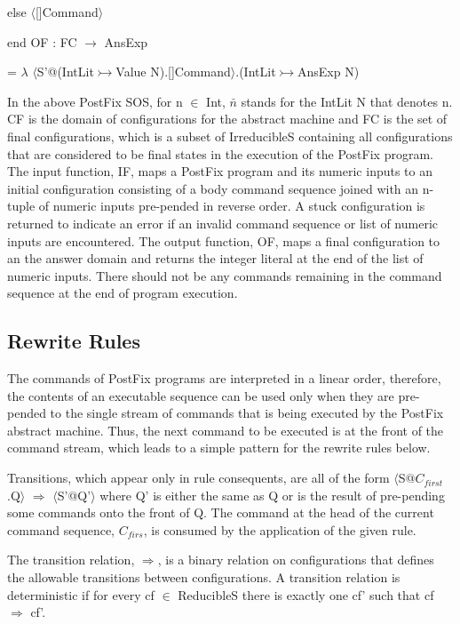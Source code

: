 \documentclass[a4paper,11pt]{article}
\begin{document}
\begin{par} else $\langle$[]Command$\rangle$ \end{par}
\begin{par} end \newline
OF : FC $\rightarrow$ AnsExp \end{par}
\begin{par} = $\lambda$ $\langle$S'@(IntLit$\rightarrowtail$Value N).[]Command$\rangle$.(IntLit$\rightarrowtail$AnsExp N) \end{par} \vspace{5mm}
\begin{par} In the above PostFix SOS, for n $\in$ Int, $\bar{n}$ stands for the IntLit N that denotes n. CF is the domain of configurations for the abstract machine and FC is the set of final configurations, which is a subset of IrreducibleS containing all configurations that are considered to be final states in the execution of the PostFix program. The input function, IF, maps a PostFix program and its numeric inputs to an initial configuration consisting of a body command sequence joined with an n-tuple of numeric inputs pre-pended in reverse order. A stuck configuration is returned to indicate an error if an invalid command sequence or list of numeric inputs are encountered. The output function, OF, maps a final configuration to an the answer domain and returns the integer literal at the end of the list of numeric inputs. There should not be any commands remaining in the command sequence at the end of program execution. \end{par}
\subsection{Rewrite Rules}
\begin{par} The commands of PostFix programs are interpreted in a linear order, therefore, the contents of an executable sequence can be used only when they are pre-pended to the single stream of commands that is being executed by the PostFix abstract machine. Thus, the next command to be executed is at the front of the command stream, which leads to a simple pattern for the rewrite rules below. \end{par}
\begin{par} Transitions, which appear only in rule consequents, are all of the form $\langle$S@$C_{first}$.Q$\rangle$ $\Rightarrow$ $\langle$S'@Q'$\rangle$ where Q' is either the same as Q or is the result of pre-pending some commands onto the front of Q. The command at the head of the current command sequence, $C_{firs}$, is consumed by the application of the given rule. \end{par}
\begin{par} The transition relation, $\Rightarrow$, is a binary relation on configurations that defines the allowable transitions between configurations. A transition relation is deterministic if for every cf $\in$ ReducibleS there is exactly one cf' such that cf $\Rightarrow$ cf'. \end{par}
\end{document}
